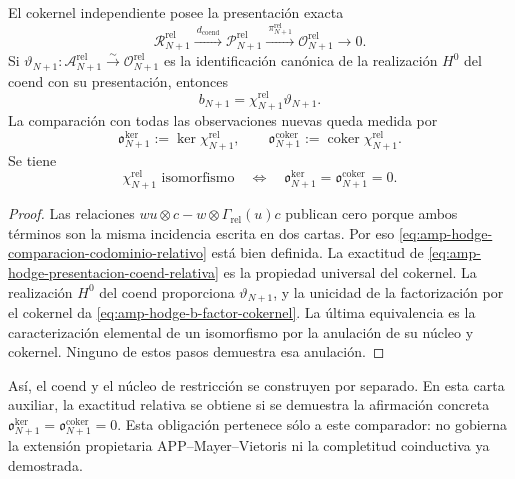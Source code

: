 \begin{lemma}
\label{lem:amp-hodge-comparacion-codominio-relativo}
El cokernel independiente posee la presentación exacta
\begin{equation}\label{eq:amp-hodge-presentacion-coend-relativa}
 \mathscr R_{N+1}^{\mathrm{rel}}
 \xrightarrow{\ d_{\mathrm{coend}}\ }
 \mathscr P_{N+1}^{\mathrm{rel}}
 \xrightarrow{\ \pi_{N+1}^{\mathrm{rel}}\ }
 \mathscr O_{N+1}^{\mathrm{rel}}\longrightarrow0 .
\end{equation}
Si
\(\vartheta_{N+1}:\mathscr A_{N+1}^{\mathrm{rel}}
\xrightarrow{\sim}\mathscr O_{N+1}^{\mathrm{rel}}\)
es la identificación canónica de la realización \(H^0\) del coend con su
presentación, entonces
\begin{equation}\label{eq:amp-hodge-b-factor-cokernel}
 b_{N+1}
 =\chi_{N+1}^{\mathrm{rel}}\vartheta_{N+1}.
\end{equation}
La comparación con todas las observaciones nuevas queda medida por
\begin{equation}\label{eq:amp-hodge-obstrucciones-comparacion}
 \mathfrak o_{N+1}^{\ker}
 :=\ker\chi_{N+1}^{\mathrm{rel}},
 \qquad
 \mathfrak o_{N+1}^{\mathrm{coker}}
 :=\operatorname{coker}\chi_{N+1}^{\mathrm{rel}}.
\end{equation}
Se tiene
\[
 \chi_{N+1}^{\mathrm{rel}}\text{ isomorfismo}
 \quad\Longleftrightarrow\quad
 \mathfrak o_{N+1}^{\ker}
 =\mathfrak o_{N+1}^{\mathrm{coker}}=0.
\]
\end{lemma}

\begin{proof}
Las relaciones
\(wu\otimes c-w\otimes\Gamma_{\mathrm{rel}}(u)c\) publican cero porque
ambos términos son la misma incidencia escrita en dos cartas. Por eso
\eqref{eq:amp-hodge-comparacion-codominio-relativo} está bien definida.
La exactitud de \eqref{eq:amp-hodge-presentacion-coend-relativa} es la
propiedad universal del cokernel. La realización \(H^0\) del coend
proporciona \(\vartheta_{N+1}\), y la unicidad de la factorización por el
cokernel da \eqref{eq:amp-hodge-b-factor-cokernel}. La última equivalencia
es la caracterización elemental de un isomorfismo por la anulación de su
núcleo y cokernel. Ninguno de estos pasos demuestra esa anulación.
\end{proof}

Así, el coend y el núcleo de restricción se construyen por separado. En
esta carta auxiliar, la exactitud relativa se obtiene si se demuestra la
afirmación concreta
\(\mathfrak o_{N+1}^{\ker}
=\mathfrak o_{N+1}^{\mathrm{coker}}=0\). Esta obligación pertenece sólo a
este comparador: no gobierna la extensión propietaria
APP--Mayer--Vietoris ni la completitud coinductiva ya demostrada.

